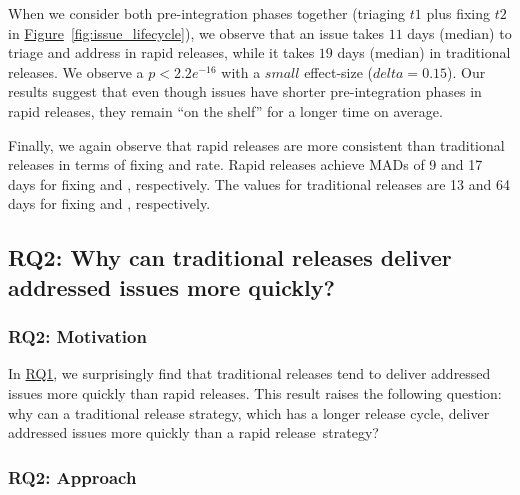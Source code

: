 When we consider both pre-integration phases together (triaging $t1$ plus
fixing $t2$ in \hyperref[fig:issue_lifecycle]{Figure}~\ref{fig:issue_lifecycle}), we observe that an issue takes
$11$ days (median) to triage and address in rapid releases, while
it takes $19$ days (median) in traditional releases. We observe a $p<2.2e^{-16}$ with a $small$
effect-size ($delta=0.15$). Our results suggest that even though issues have
shorter pre-integration phases in rapid releases, they remain ``on the
shelf'' for a longer time on average.

Finally, we again observe that rapid releases are more consistent than
traditional releases in terms of fixing and \DIFdelbegin {}\DIFdelend \DIFaddbegin {}\DIFaddend rate. Rapid releases
achieve MADs of 9 and 17 days for fixing and \DIFdelbegin {}\DIFdelend \DIFaddbegin {}\DIFaddend , respectively. The
values for traditional releases are 13 and 64 days for fixing and \DIFdelbegin {}\DIFdelend \DIFaddbegin {}\DIFaddend ,
respectively.\\ 


\subsection{RQ2: Why can traditional releases deliver addressed issues
more quickly?}\label{ch5:rq2} 

\subsubsection*{RQ2: Motivation} 

In \hyperref[ch5:rq1]{RQ1}, we surprisingly find that traditional releases tend
to deliver addressed issues more quickly than rapid releases. This result raises
the following question: why can a traditional release strategy, which has a
longer release cycle, deliver addressed issues more quickly than a rapid
release~strategy?\\

\subsubsection*{RQ2: Approach}

